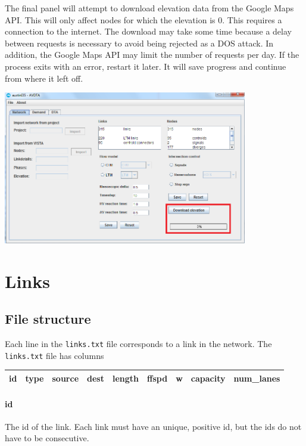 The final panel will attempt to download elevation data from the Google Maps API. This will only affect nodes for which the elevation is 0. This requires a connection to the internet. The download may take some time because a delay between requests is necessary to avoid being rejected as a DOS attack. In addition, the Google Maps API may limit the number of requests per day. If the process exits with an error, restart it later. It will save progress and continue from where it left off.
\begin{center}
\includegraphics[width=0.8\textwidth]{images/nodes3.png}
\end{center}

\section{Links}
\label{sec:links}

\subsection{File structure}

Each line in the \texttt{links.txt} file corresponds to a link in the network. The \texttt{links.txt} file has columns
\begin{center}
\begin{tabular}{ccccccccc}
\hline
id & type & source & dest & length & ffspd & w & capacity & num\_lanes \\\hline
\end{tabular}
\end{center}
\paragraph*{id} The id of the link. Each link must have an unique, positive id, but the ids do not have to be consecutive.
